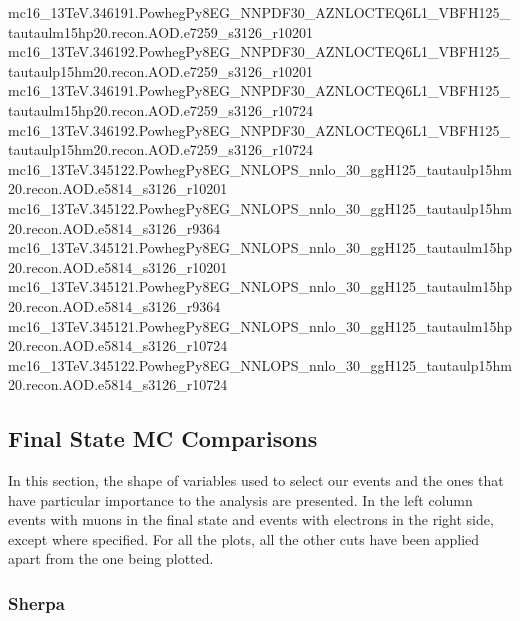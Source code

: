 {mc16\_13TeV.346191.PowhegPy8EG\_NNPDF30\_AZNLOCTEQ6L1\_VBFH125\_tautaulm15hp20.recon.AOD.e7259\_s3126\_r10201\newline  
mc16\_13TeV.346192.PowhegPy8EG\_NNPDF30\_AZNLOCTEQ6L1\_VBFH125\_tautaulp15hm20.recon.AOD.e7259\_s3126\_r10201\newline  
mc16\_13TeV.346191.PowhegPy8EG\_NNPDF30\_AZNLOCTEQ6L1\_VBFH125\_tautaulm15hp20.recon.AOD.e7259\_s3126\_r10724\newline  
mc16\_13TeV.346192.PowhegPy8EG\_NNPDF30\_AZNLOCTEQ6L1\_VBFH125\_tautaulp15hm20.recon.AOD.e7259\_s3126\_r10724\newline  
mc16\_13TeV.345122.PowhegPy8EG\_NNLOPS\_nnlo\_30\_ggH125\_tautaulp15hm20.recon.AOD.e5814\_s3126\_r10201\newline  
mc16\_13TeV.345122.PowhegPy8EG\_NNLOPS\_nnlo\_30\_ggH125\_tautaulp15hm20.recon.AOD.e5814\_s3126\_r9364\newline  
mc16\_13TeV.345121.PowhegPy8EG\_NNLOPS\_nnlo\_30\_ggH125\_tautaulm15hp20.recon.AOD.e5814\_s3126\_r10201\newline  
mc16\_13TeV.345121.PowhegPy8EG\_NNLOPS\_nnlo\_30\_ggH125\_tautaulm15hp20.recon.AOD.e5814\_s3126\_r9364\newline  
mc16\_13TeV.345121.PowhegPy8EG\_NNLOPS\_nnlo\_30\_ggH125\_tautaulm15hp20.recon.AOD.e5814\_s3126\_r10724\newline  
mc16\_13TeV.345122.PowhegPy8EG\_NNLOPS\_nnlo\_30\_ggH125\_tautaulp15hm20.recon.AOD.e5814\_s3126\_r10724}	

\clearpage
\subsection{Final State MC Comparisons}\label{DistComparisons}
In this section, the shape of variables used to select our events and the ones that have particular importance to the analysis are presented. In the left column events with muons in the final state and events with electrons in the right side, except where specified. For all the plots, all the other cuts have been applied apart from the one being plotted.
\subsubsection{Sherpa}


